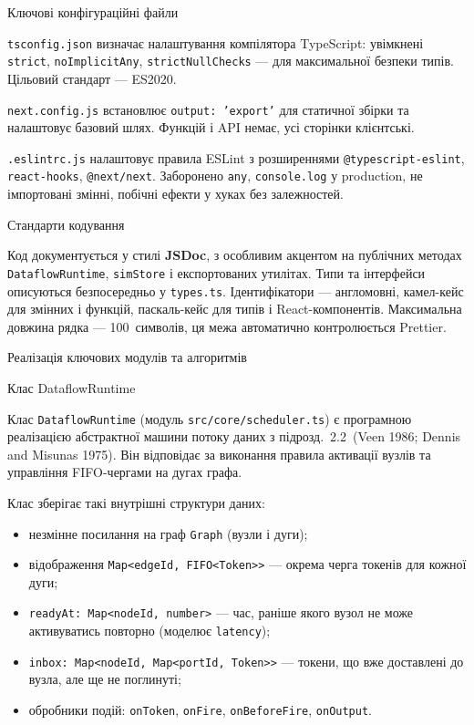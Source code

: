 Ключові конфігураційні файли

\texttt{tsconfig.json} визначає налаштування компілятора TypeScript:
увімкнені \texttt{strict}, \texttt{noImplicitAny},
\texttt{strictNullChecks} --- для максимальної безпеки типів. Цільовий
стандарт --- ES2020.

\texttt{next.config.js} встановлює \texttt{output:\ ’export’} для
статичної збірки та налаштовує базовий шлях. Функцій і API немає, усі
сторінки клієнтські.

\texttt{.eslintrc.js} налаштовує правила ESLint з розширеннями
\texttt{@typescript-eslint}, \texttt{react-hooks}, \texttt{@next/next}.
Заборонено \texttt{any}, \texttt{console.log} у production, не
імпортовані змінні, побічні ефекти у хуках без залежностей.

Стандарти кодування

Код документується у стилі \textbf{JSDoc}, з особливим акцентом на
публічних методах \texttt{DataflowRuntime}, \texttt{simStore} і
експортованих утилітах. Типи та інтерфейси описуються безпосередньо у
\texttt{types.ts}. Ідентифікатори --- англомовні, камел-кейс для змінних
і функцій, паскаль-кейс для типів і React-компонентів. Максимальна
довжина рядка --- 100~символів, ця межа автоматично контролюється
Prettier.

\protect{}\label{_Toc229681134}{}Реалізація ключових
модулів та алгоритмів

Клас DataflowRuntime

Клас \texttt{DataflowRuntime} (модуль \texttt{src/core/scheduler.ts}) є
програмною реалізацією абстрактної машини потоку даних з
підрозд.~2.2~(Veen 1986; Dennis and Misunas 1975). Він відповідає за
виконання правила активації вузлів та управління FIFO-чергами на дугах
графа.

Клас зберігає такі внутрішні структури даних:

\begin{itemize}
\item
  незмінне посилання на граф \texttt{Graph} (вузли і дуги);
\item
  відображення
  \texttt{Map\textless{}edgeId,\ FIFO\textless{}Token\textgreater{}\textgreater{}}
  --- окрема черга токенів для кожної дуги;
\item
  \texttt{readyAt:\ Map\textless{}nodeId,\ number\textgreater{}} ---
  час, раніше якого вузол не може активуватись повторно (моделює
  \texttt{latency});
\item
  \texttt{inbox:\ Map\textless{}nodeId,\ Map\textless{}portId,\ Token\textgreater{}\textgreater{}}
  --- токени, що вже доставлені до вузла, але ще не поглинуті;
\item
  обробники подій: \texttt{onToken}, \texttt{onFire},
  \texttt{onBeforeFire}, \texttt{onOutput}.
\end{itemize}

